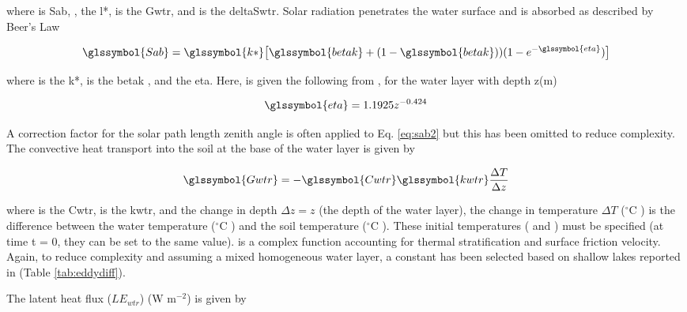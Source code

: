 \documentclass[final,3p,times,authoryear]{elsarticle}
\newcommand{\degreeC}{\ensuremath{^\circ}C }
\begin{document}
where  is \glsdesc{Sab}, , the \glsdesc{l*},  is the \glsdesc{Gwtr}, and  is the \glsdesc{deltaSwtr}. Solar radiation penetrates the water surface and is absorbed as described by Beer's Law \citep{MolinaMartinez2006}

\begin{equation} 
\glssymbol{Sab} = \glssymbol{k*} \big[ \glssymbol{betak} + (1 - \glssymbol{betak}) )(1-e^{-\glssymbol{eta}})  \big]
\label{eq:sab2} \end{equation} 

where  is the \glsdesc{k*},  is the \glsdesc{betak} \citep{MolinaMartinez2006}, and  the \glsdesc{eta}. Here,  is given the following from \cite{Subin2012a}, for the water layer with depth z(m)

\begin{equation} 
\glssymbol{eta} = 1.1925z^{-0.424}
\label{eq:eta} \end{equation} 


A correction factor for the solar path length zenith angle is often applied to Eq. \ref{eq:sab2} \citep{MolinaMartinez2006} but this has been omitted to reduce complexity. The convective heat transport  into the soil at the base of the water layer is given by \citep{MolinaMartinez2006}

\begin{equation} 
\glssymbol{Gwtr} = - \glssymbol{Cwtr} \glssymbol{kwtr} \frac{\Delta T}{\Delta z}
\label{eq:gwtr} \end{equation} 


where  is the \glsdesc{Cwtr},  is the \glsdesc{kwtr}, 
and the change in depth $\Delta z = z$ (the depth of the water layer), the change in temperature $\Delta T$ (\degreeC) is the difference between the water temperature  (\degreeC) and the soil temperature  (\degreeC). These initial temperatures ( and ) must be specified (at time t = 0, they can be set to the same value).  is a complex function accounting for thermal stratification and surface friction velocity. Again, to reduce complexity and assuming a mixed homogeneous water layer, a constant  has been selected based on shallow lakes reported in \cite{SalasDeLeon2016} (Table \ref{tab:eddydiff}).


The latent heat flux ($LE_{wtr}$) (W m$^{-2}$) is given by \citep{Arya2001}
\end{document}
